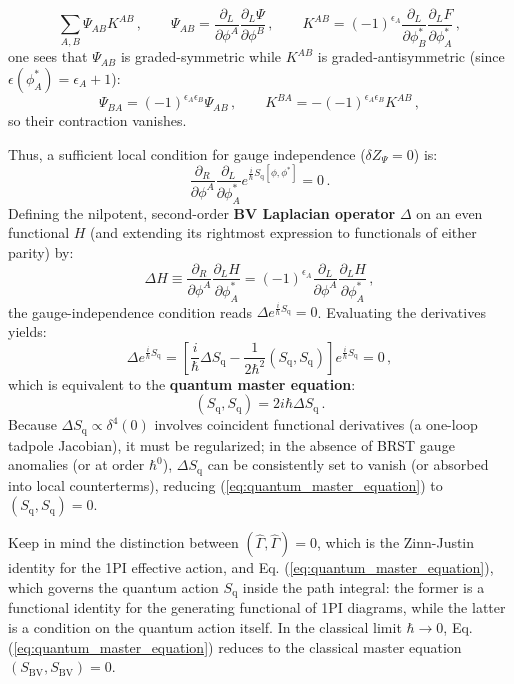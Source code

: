 \[
    \sum_{A,B} \Psi_{AB} K^{AB} \, , \qquad \Psi_{AB} = \frac{\partial_L}{\partial \phi^A} \frac{\partial_L \Psi}{\partial \phi^B} \, , \qquad K^{AB} = (-1)^{\epsilon_A} \frac{\partial_L}{\partial \phi_B^*} \frac{\partial_L F}{\partial \phi_A^*} \, ,
\]
one sees that \(\Psi_{AB}\) is graded-symmetric while \(K^{AB}\) is graded-antisymmetric (since \(\epsilon(\phi_A^*) = \epsilon_A + 1\)):
\[
    \Psi_{BA} = (-1)^{\epsilon_A \epsilon_B} \Psi_{AB} \, , \qquad K^{BA} = -(-1)^{\epsilon_A \epsilon_B} K^{AB} \, ,
\]
so their contraction vanishes.

Thus, a sufficient local condition for gauge independence (\(\delta Z_\Psi = 0\)) is:
\begin{equation} \label{eq:bv_exponential_delta_condition}
    \frac{\partial_R}{\partial \phi^A} \frac{\partial_L}{\partial \phi_A^*} e^{\frac{i}{\hbar} S_{\text{q}}[\phi, \phi^*]} = 0 \, .
\end{equation}
Defining the nilpotent, second-order \textbf{BV Laplacian operator} \(\Delta\) on an even functional \(H\) (and extending its rightmost expression to functionals of either parity) by:
\begin{equation} \label{eq:bv_laplacian_def}
    \Delta H \equiv \frac{\partial_R}{\partial \phi^A} \frac{\partial_L H}{\partial \phi_A^*} = (-1)^{\epsilon_A} \frac{\partial_L}{\partial \phi^A} \frac{\partial_L H}{\partial \phi_A^*} \, ,
\end{equation}
the gauge-independence condition reads \(\Delta e^{\frac{i}{\hbar} S_{\text{q}}} = 0\). Evaluating the derivatives yields:
\[
    \Delta e^{\frac{i}{\hbar} S_{\text{q}}} = \left[ \frac{i}{\hbar} \Delta S_{\text{q}} - \frac{1}{2\hbar^2} (S_{\text{q}}, S_{\text{q}}) \right] e^{\frac{i}{\hbar} S_{\text{q}}} = 0 \, ,
\]
which is equivalent to the \textbf{quantum master equation}:
\begin{equation} \label{eq:quantum_master_equation}
    \boxed{(S_{\text{q}}, S_{\text{q}}) = 2i\hbar \Delta S_{\text{q}}} \, .
\end{equation}
Because \(\Delta S_{\text{q}} \propto \delta^4(0)\) involves coincident functional derivatives (a one-loop tadpole Jacobian), it must be regularized; in the absence of BRST gauge anomalies (or at order \(\hbar^0\)), \(\Delta S_{\text{q}}\) can be consistently set to vanish (or absorbed into local counterterms), reducing (\ref{eq:quantum_master_equation}) to \((S_{\text{q}}, S_{\text{q}}) = 0\).

Keep in mind the distinction between \((\widehat{\Gamma}, \widehat{\Gamma}) = 0\), which is the Zinn-Justin identity for the 1PI effective action, and Eq. (\ref{eq:quantum_master_equation}), which governs the quantum action \(S_{\text{q}}\) inside the path integral: the former is a functional identity for the generating functional of 1PI diagrams, while the latter is a condition on the quantum action itself. In the classical limit \(\hbar \rightarrow 0\), Eq. (\ref{eq:quantum_master_equation}) reduces to the classical master equation \((S_{\text{BV}}, S_{\text{BV}}) = 0\).


